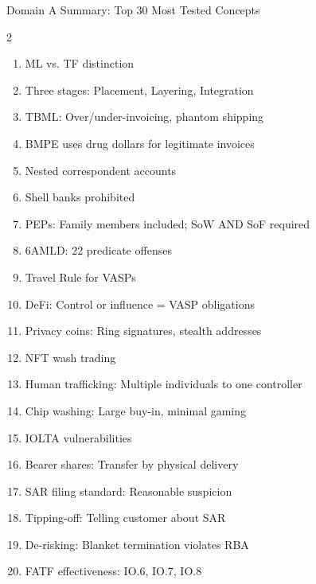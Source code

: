 \documentclass{beamer}
\begin{document}
	\begin{frame}{Domain A Summary: Top 30 Most Tested Concepts}
		\begin{multicols}{2}
			\begin{enumerate}
				\item ML vs. TF distinction
				\item Three stages: Placement, Layering, Integration
				\item TBML: Over/under-invoicing, phantom shipping
				\item BMPE uses drug dollars for legitimate invoices
				\item Nested correspondent accounts
				\item Shell banks prohibited
				\item PEPs: Family members included; SoW AND SoF required
				\item 6AMLD: 22 predicate offenses
				\item Travel Rule for VASPs
				\item DeFi: Control or influence = VASP obligations
				\item Privacy coins: Ring signatures, stealth addresses
				\item NFT wash trading
				\item Human trafficking: Multiple individuals to one controller
				\item Chip washing: Large buy-in, minimal gaming
				\item IOLTA vulnerabilities
				\item Bearer shares: Transfer by physical delivery
				\item SAR filing standard: Reasonable suspicion
				\item Tipping-off: Telling customer about SAR
				\item De-risking: Blanket termination violates RBA
				\item FATF effectiveness: IO.6, IO.7, IO.8
			\end{enumerate}
		\end{multicols}
	\end{frame}
	
\end{document}
